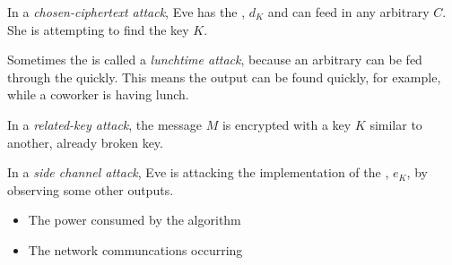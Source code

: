 \begin{definition}\label{def:Attack-Chosen_Ciphertext}
  In a \emph{chosen-ciphertext attack}, Eve has the , $d_{K}$ and can feed in any arbitrary $C$.
  She is attempting to find the key $K$.

  \begin{remark}\label{rmk:Attack-Lunchtime}
    Sometimes the  is called a \emph{lunchtime attack}, because an arbitrary  can be fed through the  quickly.
    This means the output can be found quickly, for example, while a coworker is having lunch.
  \end{remark}
\end{definition}

\begin{definition}\label{def:Attack-Related_Key}
  In a \emph{related-key attack}, the message $M$ is encrypted with a key $K$ similar to another, already broken key.
\end{definition}

\begin{definition}\label{def:Attack-Side_Channel}
  In a \emph{side channel attack}, Eve is attacking the implementation of the , $e_{K}$, by observing some other outputs.
  \begin{itemize}[noitemsep]
  \item The power consumed by the algorithm
  \item The network communcations occurring
  \end{itemize}
\end{definition}


